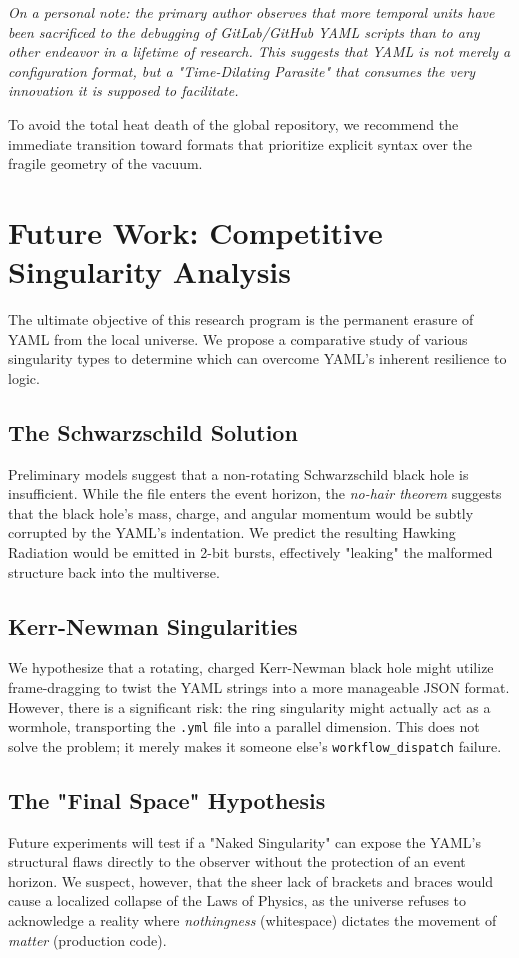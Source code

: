 \documentclass[11pt]{article}
\begin{document}
\textit{On a personal note: the primary author observes that more temporal units have been sacrificed to the debugging of GitLab/GitHub YAML scripts than to any other endeavor in a lifetime of research. This suggests that YAML is not merely a configuration format, but a "Time-Dilating Parasite" that consumes the very innovation it is supposed to facilitate.}

To avoid the total heat death of the global repository, we recommend the immediate transition toward formats that prioritize explicit syntax over the fragile geometry of the vacuum.


\section{Future Work: Competitive Singularity Analysis}
The ultimate objective of this research program is the permanent erasure of YAML from the local universe. We propose a comparative study of various singularity types to determine which can overcome YAML's inherent resilience to logic.

\subsection{The Schwarzschild Solution}
Preliminary models suggest that a non-rotating Schwarzschild black hole is insufficient. While the file enters the event horizon, the \textit{no-hair theorem} suggests that the black hole's mass, charge, and angular momentum would be subtly corrupted by the YAML's indentation. We predict the resulting Hawking Radiation would be emitted in 2-bit bursts, effectively "leaking" the malformed structure back into the multiverse.

\subsection{Kerr-Newman Singularities}
We hypothesize that a rotating, charged Kerr-Newman black hole might utilize frame-dragging to twist the YAML strings into a more manageable JSON format. However, there is a significant risk: the ring singularity might actually act as a wormhole, transporting the \texttt{.yml} file into a parallel dimension. This does not solve the problem; it merely makes it someone else's \texttt{workflow\_dispatch} failure.

\subsection{The "Final Space" Hypothesis}
Future experiments will test if a "Naked Singularity" can expose the YAML's structural flaws directly to the observer without the protection of an event horizon. We suspect, however, that the sheer lack of brackets and braces would cause a localized collapse of the Laws of Physics, as the universe refuses to acknowledge a reality where \textit{nothingness} (whitespace) dictates the movement of \textit{matter} (production code).
\end{document}
